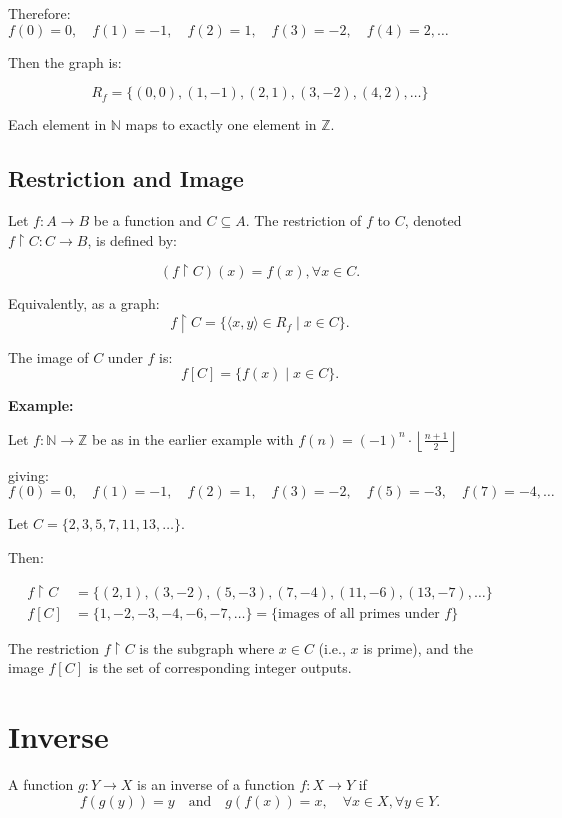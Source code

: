 \documentclass[12pt,a4paper,openany]{article}
\begin{document}
Therefore: $f(0) = 0, \quad f(1) = -1, \quad f(2) = 1, \quad f(3) = -2, \quad f(4) = 2, \ldots$

Then the graph is:

\[R_f = \{(0,0), (1,-1), (2,1), (3,-2), (4,2), \ldots\}\]

Each element in $\mathbb{N}$ maps to exactly one element in $\mathbb{Z}$.

\subsection{Restriction and Image}

Let $f : A \to B$ be a function and $C \subseteq A$. The restriction of $f$ to $C$, denoted $f \upharpoonright C : C \to B$, is defined by:

\[
(f \upharpoonright C)(x) = f(x), \forall x \in C.
\]

Equivalently, as a graph:
\[
f \upharpoonright C = \{ \langle x, y \rangle \in R_f \mid x \in C \}.
\]

The image of $C$ under $f$ is:
\[
f[C] = \{ f(x) \mid x \in C \}.
\]

\textbf{Example:}

Let $f : \mathbb{N} \to \mathbb{Z}$ be as in the earlier example with $f(n) = (-1)^n \cdot \left\lfloor \displaystyle\frac{n+1}{2} \right\rfloor$

giving:
\[
f(0) = 0, \quad f(1) = -1, \quad f(2) = 1, \quad f(3) = -2, \quad f(5) = -3, \quad f(7) = -4, \ldots
\]

Let $C = \{2, 3, 5, 7, 11, 13, \ldots\}$. 

Then:

\[
\begin{aligned}
f \upharpoonright C &= \{(2, 1), (3, -2), (5, -3), (7, -4), (11, -6), (13, -7), \ldots\} \\
f[C] &= \{1, -2, -3, -4, -6, -7, \ldots\} = \{\text{images of all primes under } f\}
\end{aligned}
\]

The restriction $f \upharpoonright C$ is the subgraph where $x \in C$ (i.e., $x$ is prime), and the image $f[C]$ is the set of corresponding integer outputs.


\section{Inverse}

A function $g : Y \to X$ is an inverse of a function $f : X \to Y$ if
\[
f(g(y)) = y \quad \text{and} \quad g(f(x)) = x, \quad \forall x \in X, \forall y \in Y.
\]
\end{document}
